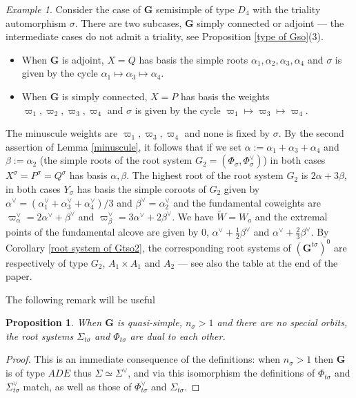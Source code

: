 \documentclass{amsart}
\newtheorem{proposition}[equation]{Proposition}
\numberwithin{equation}{section}
\theoremstyle{definition}
\theoremstyle{remark}
\newtheorem{example}[equation]{Example}
\newcommand\bG{{\mathbf G}}
\newcommand\Gtso{{(\bG^{t\sigma})^0}}
\newcommand\tW{{\widetilde W}}
\newcommand\Wa{W_a}
\begin{document}
\begin{example}
Consider the case of $\bG$ semisimple of type $D_4$ with the triality
automorphism $\sigma$. 
There are two subcases, $\bG$ simply connected or adjoint ---
the intermediate cases do not admit a triality, see Proposition \ref{type of Gso}(3).
\begin{itemize}
\item When $\bG$ is adjoint, $X=Q$ has basis the simple roots
$\alpha_1,\alpha_2,\alpha_3,\alpha_4$
and $\sigma$ is given by the cycle
$\alpha_1\mapsto\alpha_3\mapsto\alpha_4$.
\item When $\bG$ is simply connected, $X=P$ has basis the weights
$\varpi_1,\varpi_2,\varpi_3,\varpi_4$
and $\sigma$ is given by the cycle
$\varpi_1\mapsto\varpi_3\mapsto\varpi_4$.
\end{itemize}
The minuscule weights are $\varpi_1,\varpi_3,\varpi_4$ and none is fixed by
$\sigma$. By the second assertion of Lemma \ref{minuscule}, it follows that
if we set $\alpha:=\alpha_1+\alpha_3+\alpha_4$ and $\beta:=\alpha_2$
(the simple roots of the root system
$G_2=(\Phi_\sigma,\Phi_\sigma^\vee)$) in both cases $X^\sigma=P^\sigma=Q^\sigma$
has basis $\alpha,\beta$. The
highest root of the root system $G_2$ is $2\alpha+3\beta$, in both cases
$Y_\sigma$ has basis the simple coroots of $G_2$ given by
$\alpha^\vee=(\alpha_1^\vee+\alpha_3^\vee+\alpha_4^\vee)/3$ and
$\beta^\vee=\alpha^\vee_2$ and the fundamental coweights are
$\varpi_\alpha^\vee=2\alpha^\vee+\beta^\vee$ and
$\varpi_\beta^\vee=3\alpha^\vee+2\beta^\vee$. We have $\tW=\Wa$ and
the extremal
points of the fundamental alcove are given by 0, $\alpha^\vee+\frac12\beta^\vee$
and $\alpha^\vee+\frac23\beta^\vee$. By Corollary \ref{root system of Gtso2},
the corresponding root systems
of $\Gtso$ are respectively of type $G_2$, $A_1\times A_1$ and $A_2$
--- see also the table at the end of the paper.
\end{example}
The following remark will be useful
\begin{proposition}\label{cas facile}
When $\bG$ is quasi-simple, $n_\sigma>1$ and there are no special orbits, 
the root systems $\Sigma_{t\sigma}$
and $\Phi_{t\sigma}$ are dual to each other.
\end{proposition}
\begin{proof}
This is an immediate consequence of the definitions: when $n_\sigma>1$
then $\bG$ is of type $ADE$ thus $\Sigma\simeq\Sigma^\vee$,
and via this isomorphism the definitions of $\Phi_{t\sigma}$ and 
$\Sigma_{t\sigma}^\vee$ match, as well as those of $\Phi_{t\sigma}^\vee$
and $\Sigma_{t\sigma}$.
\end{proof}
\end{document}
